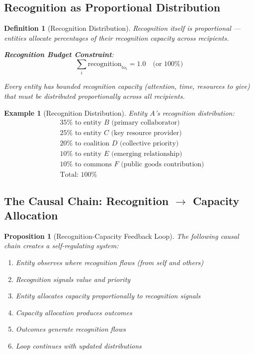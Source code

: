 \documentclass[11pt]{article}
\newtheorem{definition}{Definition}
\newtheorem{proposition}{Proposition}
\newtheorem{example}{Example}
\begin{document}
\subsection{Recognition as Proportional Distribution}

\begin{definition}[Recognition Distribution]
Recognition itself is proportional — entities allocate percentages of their recognition capacity across recipients.

\textbf{Recognition Budget Constraint}:
\[
\sum_i \text{recognition}_{\text{to}_i} = 1.0 \quad \text{(or 100\%)}
\]

Every entity has bounded recognition capacity (attention, time, resources to give) that must be distributed proportionally across all recipients.
\end{definition}

\begin{example}[Recognition Distribution]
Entity $A$'s recognition distribution:
\begin{align*}
&35\% \text{ to entity } B \text{ (primary collaborator)} \\
&25\% \text{ to entity } C \text{ (key resource provider)} \\
&20\% \text{ to coalition } D \text{ (collective priority)} \\
&10\% \text{ to entity } E \text{ (emerging relationship)} \\
&10\% \text{ to commons } F \text{ (public goods contribution)} \\
&\text{Total: } 100\%
\end{align*}
\end{example}

\subsection{The Causal Chain: Recognition $\to$ Capacity Allocation}

\begin{proposition}[Recognition-Capacity Feedback Loop]
The following causal chain creates a self-regulating system:
\begin{enumerate}
\item Entity observes where recognition flows (from self and others)
\item Recognition signals value and priority
\item Entity allocates capacity proportionally to recognition signals
\item Capacity allocation produces outcomes
\item Outcomes generate recognition flows
\item Loop continues with updated distributions
\end{enumerate}
\end{proposition}
\end{document}
